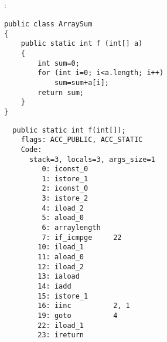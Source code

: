 \subsection{}

:

\begin{lstlisting}
public class ArraySum
{
	public static int f (int[] a)
	{
		int sum=0;
		for (int i=0; i<a.length; i++)
			sum=sum+a[i];
		return sum;
	}
}
\end{lstlisting}

\begin{lstlisting}
  public static int f(int[]);
    flags: ACC_PUBLIC, ACC_STATIC
    Code:
      stack=3, locals=3, args_size=1
         0: iconst_0      
         1: istore_1      
         2: iconst_0      
         3: istore_2      
         4: iload_2       
         5: aload_0       
         6: arraylength   
         7: if_icmpge     22
        10: iload_1       
        11: aload_0       
        12: iload_2       
        13: iaload        
        14: iadd          
        15: istore_1      
        16: iinc          2, 1
        19: goto          4
        22: iload_1       
        23: ireturn       
\end{lstlisting}

